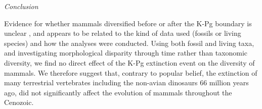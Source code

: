 \documentclass[12pt,letterpaper]{article}
\renewcommand{\subsection}[1]{%
\bigskip
\begin{center}
\begin{large}
\normalfont\itshape #1
\end{large}
\end{center}}
\begin{document}

\subsection{Conclusion}

Evidence for whether mammals diversified before or after the K-Pg boundary is unclear \citep{meredithimpacts2011,O'Leary08022013,dosReis2014,beckancient2014}, and appears to be related to the kind of data used (fossils or living species) and how the analyses were conducted.
Using both fossil and living taxa, and investigating morphological disparity through time rather than taxonomic diversity, we find no direct effect of the K-Pg extinction event on the diversity of mammals. 
We therefore suggest that, contrary to popular belief, the extinction of many terrestrial vertebrates including the non-avian dinosaurs 66 million years ago, did not significantly affect the evolution of mammals throughout the Cenozoic.
\end{document}
